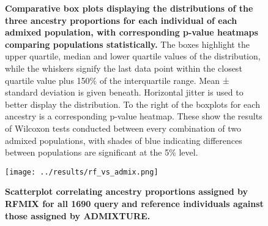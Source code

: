 \documentclass[11pt]{article}
\begin{document}




\begin{figure}[ht!]%
    \centering
     \hspace*{0em}
        \vspace{-0.6cm}
        \caption{\textbf{
            Comparative box plots displaying the distributions of the three ancestry proportions for each individual of each admixed population, with corresponding p-value heatmaps comparing populations statistically.
        }
            The boxes highlight the upper quartile, median and lower quartile values of the distribution, while the whiskers signify the last data point within the closest quartile value plus 150\% of the interquartile range. Mean ± standard deviation is given beneath. Horizontal jitter is used to better display the distribution. To the right of the boxplots for each ancestry is a corresponding p-value heatmap. These show the results of Wilcoxon tests conducted between every combination of two admixed populations, with shades of blue indicating differences between populations are significant at the 5\% level.
        }
\end{figure}




\begin{figure}[htb!]%
    \centering
    \texttt{[image: ../results/rf\_vs\_admix.png]} 
    \vspace{.2cm}
    \caption{\textbf{
        Scatterplot correlating ancestry proportions assigned by RFMIX for all 1690 query and reference individuals against those assigned by ADMIXTURE.
    }
    }
\end{figure}
\end{document}
